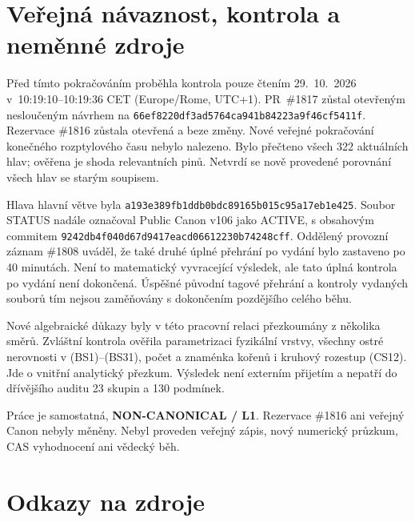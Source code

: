 \documentclass[11pt,a4paper]{article}
\theoremstyle{remark}\newtheorem{remark}[theorem]{Poznámka}
\numberwithin{equation}{section}
\begin{document}
\section{Veřejná návaznost, kontrola a neměnné zdroje}

Před tímto pokračováním proběhla kontrola pouze čtením
29.~10.~2026 v~10:19:10--10:19:36 CET
(Europe/Rome, UTC+1). PR~\#1817 zůstal otevřeným
nesloučeným návrhem na
\nolinkurl{66ef8220df3ad5764ca941b84223a9f46cf5411f}.
Rezervace \#1816 zůstala otevřená a beze změny.
Nové veřejné pokračování konečného rozptylového času
nebylo nalezeno. Bylo přečteno všech 322 aktuálních hlav;
ověřena je shoda relevantních pinů. Netvrdí se nově
provedené porovnání všech hlav se starým soupisem.

Hlava hlavní větve byla
\nolinkurl{a193e389fb1ddb0bdc89165b015c95a17eb1e425}.
Soubor STATUS nadále označoval Public Canon v106 jako
ACTIVE, s obsahovým commitem
\nolinkurl{9242db4f040d67d9417eacd06612230b74248cff}.
Oddělený provozní záznam \#1808 uváděl, že také druhé
úplné přehrání po vydání bylo zastaveno po 40 minutách.
Není to matematický vyvracející výsledek, ale tato úplná
kontrola po vydání není dokončená. Úspěšné původní
tagové přehrání a kontroly vydaných souborů tím nejsou
zaměňovány s dokončením pozdějšího celého běhu.

Nové algebraické důkazy byly v této pracovní relaci
přezkoumány z několika směrů. Zvláštní kontrola ověřila
parametrizaci fyzikální vrstvy, všechny ostré nerovnosti
v (BS1)--(BS31), počet a znaménka kořenů i kruhový
rozestup (CS12). Jde o vnitřní analytický přezkum.
Výsledek není externím přijetím a nepatří do dřívějšího
auditu 23 skupin a 130 podmínek.

Práce je samostatná, \textbf{NON-CANONICAL / L1}.
Rezervace \#1816 ani veřejný Canon nebyly měněny.
Nebyl proveden veřejný zápis, nový numerický průzkum,
CAS vyhodnocení ani vědecký běh.

\section*{Odkazy na zdroje}
\end{document}
